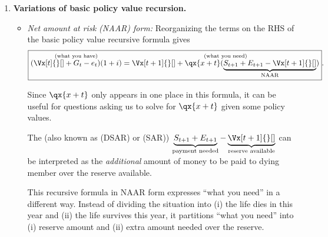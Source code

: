 \begin{enumerate}
\begin{center}
\end{center}
\item \label{it:policy-val-recurs-variations}
\textbf{Variations of basic policy value recursion.}
\begin{itemize}
\item \emph{Net amount at risk (NAAR) form:} Reorganizing the terms on the RHS
of the basic policy value recursive formula gives
\[
\boxed{\overset{\text{(what you have)}}{(\Vx[t]{}[]+G_t-e_t)(1+i)}
=\overset{\text{(what you need)}}{\Vx[t+1]{}[]+\qx{x+t}(\underbrace{S_{t+1}+E_{t+1}-\Vx[t+1]{}[]}_{\text{NAAR}})}}.
\]
\begin{note}
Since \(\qx{x+t}\) only appears in one place in this formula, it can be useful
for questions asking us to solve for \(\qx{x+t}\) given some policy values.
\end{note}

The  (also known as  (DSAR)
or  (SAR)) \(\underbrace{S_{t+1}+E_{t+1}}_{\text{payment
needed}}-\underbrace{\Vx[t+1]{}[]}_{\text{reserve available}}\) can be
interpreted as the \emph{additional} amount of money to be paid to dying member
over the reserve available.

This recursive formula in NAAR form expresses ``what you need'' in a different
way. Instead of dividing the situation into (i) the life dies  in
this year and (ii) the life survives this year, it partitions ``what you need''
into (i) reserve amount and (ii) extra amount needed over the reserve.


\end{itemize}
\end{enumerate}
